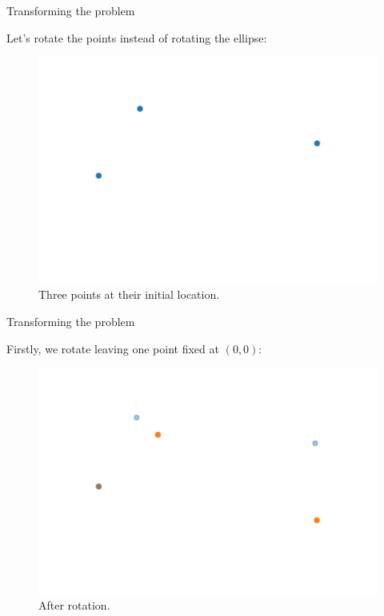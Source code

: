 \documentclass{beamer}
\begin{document}
\begin{frame}{Transforming the problem}
	
	Let's rotate the points instead of rotating the ellipse:
	
	\begin{figure}
		\centering
		\includegraphics[scale=.5]{sol1}
		\caption{Three points at their initial location.}
		\label{fig:sol1}
	\end{figure}
\end{frame}

\begin{frame}{Transforming the problem}
	
	Firstly, we rotate leaving one point fixed at $(0, 0)$:
	
	\begin{figure}
		\centering
		\includegraphics[scale=.5]{sol2}
		\caption{After rotation.}
		\label{fig:sol2}
	\end{figure}
\end{frame}
\end{document}
